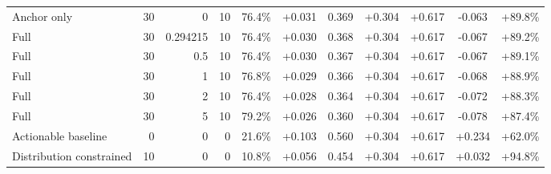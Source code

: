 \begin{table}[htbp]
\begin{tabular}{lrrrccccccc}
Anchor only & 30 & 0 & 10 & 76.4\% & +0.031 & 0.369 & +0.304 & +0.617 & -0.063 & +89.8\% \\
Full & 30 & 0.294215 & 10 & 76.4\% & +0.030 & 0.368 & +0.304 & +0.617 & -0.067 & +89.2\% \\
Full & 30 & 0.5 & 10 & 76.4\% & +0.030 & 0.367 & +0.304 & +0.617 & -0.067 & +89.1\% \\
Full & 30 & 1 & 10 & 76.8\% & +0.029 & 0.366 & +0.304 & +0.617 & -0.068 & +88.9\% \\
Full & 30 & 2 & 10 & 76.4\% & +0.028 & 0.364 & +0.304 & +0.617 & -0.072 & +88.3\% \\
Full & 30 & 5 & 10 & 79.2\% & +0.026 & 0.360 & +0.304 & +0.617 & -0.078 & +87.4\% \\
Actionable baseline & 0 & 0 & 0 & 21.6\% & +0.103 & 0.560 & +0.304 & +0.617 & +0.234 & +62.0\% \\
Distribution constrained & 10 & 0 & 0 & 10.8\% & +0.056 & 0.454 & +0.304 & +0.617 & +0.032 & +94.8\% \\
\bottomrule
\end{tabular}
\end{table}